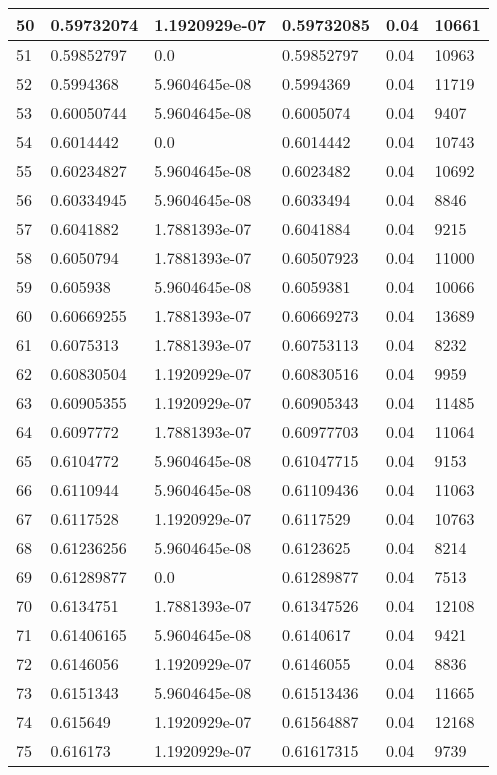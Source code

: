 \begin{longtable}{|l|l|l|l|l|l|}
50 & 0.59732074 & 1.1920929e-07 & 0.59732085 & 0.04 & 10661 \\ \hline 
51 & 0.59852797 & 0.0 & 0.59852797 & 0.04 & 10963 \\ \hline 
52 & 0.5994368 & 5.9604645e-08 & 0.5994369 & 0.04 & 11719 \\ \hline 
53 & 0.60050744 & 5.9604645e-08 & 0.6005074 & 0.04 & 9407 \\ \hline 
54 & 0.6014442 & 0.0 & 0.6014442 & 0.04 & 10743 \\ \hline 
55 & 0.60234827 & 5.9604645e-08 & 0.6023482 & 0.04 & 10692 \\ \hline 
56 & 0.60334945 & 5.9604645e-08 & 0.6033494 & 0.04 & 8846 \\ \hline 
57 & 0.6041882 & 1.7881393e-07 & 0.6041884 & 0.04 & 9215 \\ \hline 
58 & 0.6050794 & 1.7881393e-07 & 0.60507923 & 0.04 & 11000 \\ \hline 
59 & 0.605938 & 5.9604645e-08 & 0.6059381 & 0.04 & 10066 \\ \hline 
60 & 0.60669255 & 1.7881393e-07 & 0.60669273 & 0.04 & 13689 \\ \hline 
61 & 0.6075313 & 1.7881393e-07 & 0.60753113 & 0.04 & 8232 \\ \hline 
62 & 0.60830504 & 1.1920929e-07 & 0.60830516 & 0.04 & 9959 \\ \hline 
63 & 0.60905355 & 1.1920929e-07 & 0.60905343 & 0.04 & 11485 \\ \hline 
64 & 0.6097772 & 1.7881393e-07 & 0.60977703 & 0.04 & 11064 \\ \hline 
65 & 0.6104772 & 5.9604645e-08 & 0.61047715 & 0.04 & 9153 \\ \hline 
66 & 0.6110944 & 5.9604645e-08 & 0.61109436 & 0.04 & 11063 \\ \hline 
67 & 0.6117528 & 1.1920929e-07 & 0.6117529 & 0.04 & 10763 \\ \hline 
68 & 0.61236256 & 5.9604645e-08 & 0.6123625 & 0.04 & 8214 \\ \hline 
69 & 0.61289877 & 0.0 & 0.61289877 & 0.04 & 7513 \\ \hline 
70 & 0.6134751 & 1.7881393e-07 & 0.61347526 & 0.04 & 12108 \\ \hline 
71 & 0.61406165 & 5.9604645e-08 & 0.6140617 & 0.04 & 9421 \\ \hline 
72 & 0.6146056 & 1.1920929e-07 & 0.6146055 & 0.04 & 8836 \\ \hline 
73 & 0.6151343 & 5.9604645e-08 & 0.61513436 & 0.04 & 11665 \\ \hline 
74 & 0.615649 & 1.1920929e-07 & 0.61564887 & 0.04 & 12168 \\ \hline 
75 & 0.616173 & 1.1920929e-07 & 0.61617315 & 0.04 & 9739 \\ \hline 
\end{longtable}